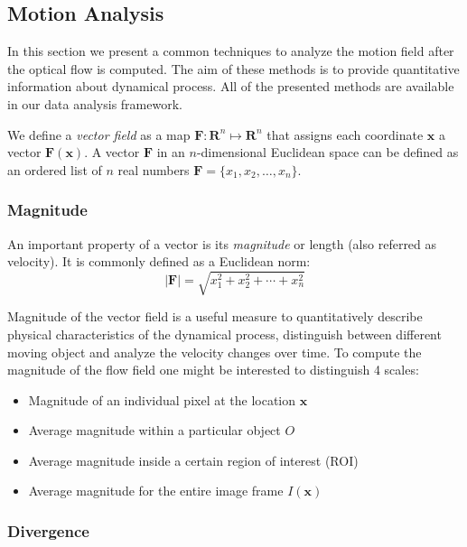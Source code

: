\subsection{Motion Analysis}
\label{motion_analysis}
            
In this section we present a common techniques to analyze the motion field after the optical flow is computed.  The aim of these methods is to provide quantitative information about dynamical process. 
All of the presented methods are available in our data analysis framework. 

We define a \textit{vector field}  as a map $\textbf{F}: \textbf{R}^n \mapsto \textbf{R}^n $ that assigns each coordinate $\textbf{x}$ a vector $\textbf{F}(\textbf{x})$. 
A vector $\textbf{F}$ in an $n$-dimensional Euclidean space can be defined as an ordered list of $n$ real numbers  $\textbf{F} = \lbrace x_1, x_2, \ldots, x_n \rbrace$.
 
            
\subsubsection{Magnitude}
\label{magnitude}

An important property of a vector is its \textit{magnitude} or length (also referred as velocity). It is commonly defined as a Euclidean norm:
$$| \textbf{F} | = \sqrt{x_1^2 + x_2^2 + \cdots + x_n^2 } $$

Magnitude of the vector field is a useful measure to quantitatively describe physical characteristics of the dynamical process, distinguish between different moving object and analyze the velocity changes over time. 
To compute the magnitude of the flow field one might be interested to distinguish 4 scales:
\begin{itemize}
  \item Magnitude of an individual pixel at the location $\textbf{x}$
  \item Average magnitude within a particular object $O$
  \item Average magnitude inside a certain region of interest (ROI)
  \item Average magnitude for the entire image frame $I(\textbf{x})$
\end{itemize}
    

\subsubsection{Divergence}
\label{divergence}

